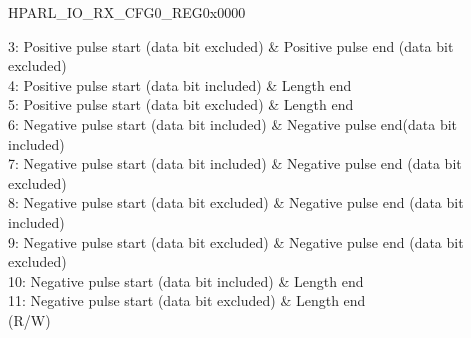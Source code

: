 \begin{register}{H}{PARL\_IO\_RX\_CFG0\_REG}{0x0000}
\begin{regdesc}
\begin{reglist}
3: Positive pulse start (data bit excluded) \& Positive pulse end (data bit excluded)\\
4: Positive pulse start (data bit included) \& Length end\\
5: Positive pulse start (data bit excluded) \& Length end\\
6: Negative pulse start (data bit included) \& Negative pulse end(data bit included)\\
7: Negative pulse start (data bit included) \& Negative pulse end (data bit excluded)\\
8: Negative pulse start (data bit excluded) \& Negative pulse end (data bit included)\\
9: Negative pulse start (data bit excluded) \& Negative pulse end (data bit excluded)\\
10: Negative pulse start (data bit included) \& Length end\\
11: Negative pulse start (data bit excluded) \& Length end\\
(R/W)

\item [Continued on the next page...]
\end{reglist}\end{regdesc}
\end{register}
\addtocounter{Regfloat}{-1}
